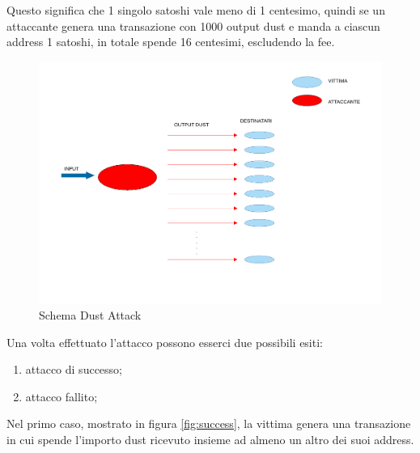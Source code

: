 Questo significa che 1 singolo satoshi vale meno di 1 centesimo, quindi se un attaccante genera una transazione con 1000 output dust e manda a ciascun address 1 satoshi, in totale spende 16 centesimi, escludendo la fee.   
\begin{figure}[h!]
    \centering
    \includegraphics[scale=0.5, trim = 1cm 5cm 0cm 0cm, clip]{Images/dust_attack.pdf}
    \caption{Schema Dust Attack}
    \label{fig:Dust_attack}
\end{figure}
\FloatBarrier
Una volta effettuato l'attacco possono esserci due possibili esiti: 
    \begin{enumerate}
        \item attacco di successo;
        \item attacco fallito;
    \end{enumerate}
    
Nel primo caso, mostrato in figura \ref{fig:success}, la vittima genera una transazione in cui spende l'importo dust ricevuto insieme ad almeno un altro dei suoi address. 

